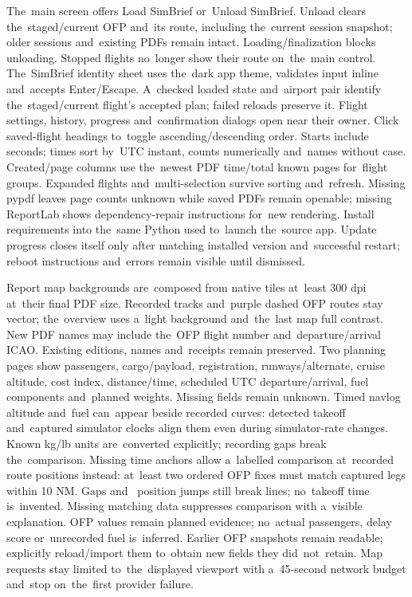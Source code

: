 \documentclass[11pt,a4paper]{article}
\begin{document}
The~main screen offers Load SimBrief or~Unload SimBrief. Unload clears
the~staged/current OFP and~its route, including the~current session snapshot;
older sessions and~existing PDFs remain intact. Loading/finalization blocks
unloading. Stopped flights no~longer show their route on~the~main control.
The~SimBrief identity sheet uses the~dark app theme, validates input inline
and~accepts Enter/Escape. A~checked loaded state and~airport pair identify
the~staged/current flight's accepted plan; failed reloads preserve it. Flight
settings, history, progress and~confirmation dialogs open near their owner.
Click saved-flight headings to~toggle ascending/descending order. Starts include
seconds; times sort by~UTC instant, counts numerically and~names without case.
Created/page columns use the~newest PDF time/total known pages for~flight
groups.
Expanded flights and~multi-selection survive sorting and~refresh. Missing pypdf
leaves page counts unknown while saved PDFs remain openable; missing ReportLab
shows dependency-repair instructions for~new rendering. Install requirements
into the~same Python used to~launch the~source app. Update progress closes
itself
only after matching installed version and~successful restart; reboot
instructions
and~errors remain visible until dismissed.

Report map backgrounds are~composed from native tiles at~least 300 dpi
at~their final PDF size. Recorded tracks and~purple dashed OFP routes stay
vector; the~overview uses a~light background and~the~last map full contrast.
New PDF names may include the~OFP flight number and~departure/arrival ICAO.
Existing editions, names and~receipts remain preserved. Two planning pages
show passengers, cargo/payload, registration, runways/alternate, cruise
altitude,
cost index, distance/time, scheduled UTC departure/arrival, fuel components
and~planned weights. Missing fields remain unknown. Timed navlog altitude
and~fuel can~appear beside recorded curves: detected takeoff and~captured
simulator clocks align them even during simulator-rate changes. Known kg/lb
units are~converted explicitly; recording gaps break the~comparison. Missing
time anchors allow a~labelled comparison at~recorded route positions instead:
at~least two ordered OFP fixes must match captured legs within 10 NM. Gaps and~
position jumps still break lines; no~takeoff time is~invented. Missing matching
data suppresses comparison with a~visible explanation. OFP values remain planned
evidence; no~actual passengers, delay score or~unrecorded fuel is~inferred.
Earlier OFP snapshots remain readable; explicitly reload/import them to~obtain
new fields they did~not~retain. Map requests stay limited to~the~displayed
viewport with a~45-second network budget and~stop on~the~first provider failure.
\end{document}
